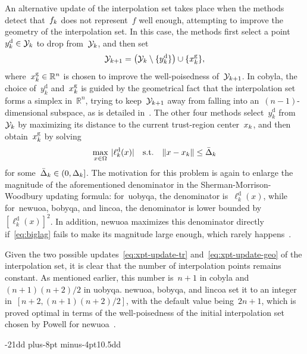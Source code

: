 \documentclass[
    smallextended,  %
    draft,          %
    final,          %
]{svjour3}
\makeatletter
\newcommand{\R}{\mathbb{R}}
\newcommand{\abs}[2][]{#1\lvert#2#1\rvert}
\newcommand{\drop}{{\text{d}}}
\newcommand{\fset}{\Omega}
\newcommand{\geo}{{\text{g}}}
\newcommand{\iter}[1][k]{x\ifthenelse{\equal{#1}{}}{}{_{#1}}}
\newcommand{\norm}[2][]{#1\lVert#2#1\rVert}
\newcommand{\objm}[1][k]{\obj\ifthenelse{\equal{#1}{}}{}{_{#1}}}
\newcommand{\obj}{f}
\newcommand{\radalt}[1][k]{\bar{\Delta}\ifthenelse{\equal{#1}{}}{}{_{#1}}}
\newcommand{\rad}[1][k]{\Delta\ifthenelse{\equal{#1}{}}{}{_{#1}}}
\newcommand{\set}[2][]{#1\{#2#1\}}
\newcommand{\st}{\text{s.t.}}
\newcommand{\xpt}[1][k]{\mathcal{Y}\ifthenelse{\equal{#1}{}}{}{_{#1}}}
\def\subsection{\@startsection{subsection}{2}{\z@}%
    {-21dd plus-8pt minus-4pt}{10.5dd}
     {\normalsize\bfseries}}
\makeatother
\begin{document}
An alternative update of the interpolation set takes place
when the methods detect that~$\objm$ does not represent~$\obj$ well enough, attempting
to improve the geometry of the interpolation set.
In this case, the methods first select a point~$y_k^{\drop} \in \xpt$ to drop from~$\xpt$, and then set
\begin{equation}
    \label{eq:xpt-update-geo}
    \xpt[k + 1] = \big(\xpt \setminus \set{y_k^{\drop}}\big) \cup \set{\iter^{\geo}},
\end{equation}
where~$\iter^{\geo} \in \R^n$ is chosen to improve the well-poisedness of~$\xpt[k + 1]$.
In \gls{cobyla}, the choice of~$y_k^{\drop}$ and~$\iter^{\geo}$ is guided by the geometrical fact
that the interpolation set forms a simplex in~$\R^n$, trying to keep~$\xpt[k+1]$ away from falling into
an~$(n-1)$-dimensional subspace, as is detailed in~\cite[equations~(15)--(17)]{Powell_1994}.
The other four methods select~$y_k^{\drop}$ from~$\xpt$ by maximizing its distance to
the current trust-region center~$\iter$, and then obtain~$\iter^{\geo}$ by solving
\begin{equation}
    \label{eq:biglag}
        \max_{x \in \fset} ~\abs{\ell_k^{\drop}(x)} \quad \st \quad \norm{x - \iter} \le \radalt
\end{equation}
for some~$\radalt \in (0, \rad]$.
The motivation for this problem is again to enlarge the magnitude of the
aforementioned denominator in the Sherman-Morrison-Woodbury updating formula:
for~\gls{uobyqa}, the denominator is~$\ell_k^{\drop}(x)$, while for~\gls{newuoa}, \gls{bobyqa},
and \gls{lincoa}, the denominator is lower bounded by~$[\ell_k^{\drop}(x)]^2$.
In addition, \gls{newuoa} maximizes this denominator directly if~\eqref{eq:biglag}
fails to make its magnitude large enough, which rarely happens~\cite[\S~6]{Powell_2006}.

Given the two possible updates~\eqref{eq:xpt-update-tr} and~\eqref{eq:xpt-update-geo} of the
interpolation set, it is clear that the number of interpolation points remains constant.
As mentioned earlier, this number is~$n+1$ in \gls{cobyla} and~$(n+1)(n+2)/2$ in \gls{uobyqa}.
\gls{newuoa}, \gls{bobyqa}, and \gls{lincoa} set it to an integer in~$[n+2, (n+1)(n+2)/2]$,
with the default value being~$2n+1$, which is proved optimal in terms of the well-poisedness of
the initial interpolation set chosen by Powell for \gls{newuoa}~\cite{Ragonneau_Zhang_2023a}.%


\subsection{}
\label{ssec:cobyla}
\end{document}

